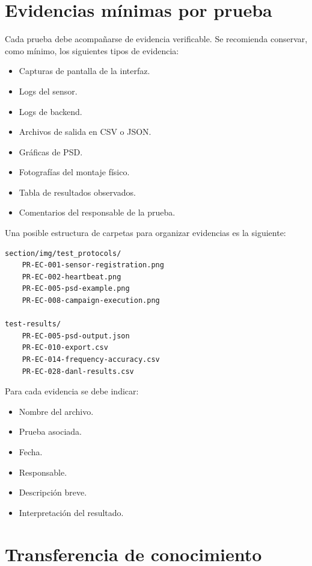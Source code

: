 \section{Evidencias mínimas por prueba}

Cada prueba debe acompañarse de evidencia verificable. Se recomienda conservar, como mínimo, los siguientes tipos de evidencia:

\begin{itemize}
    \item Capturas de pantalla de la interfaz.
    \item Logs del sensor.
    \item Logs de backend.
    \item Archivos de salida en CSV o JSON.
    \item Gráficas de PSD.
    \item Fotografías del montaje físico.
    \item Tabla de resultados observados.
    \item Comentarios del responsable de la prueba.
\end{itemize}

Una posible estructura de carpetas para organizar evidencias es la siguiente:

\begin{verbatim}
section/img/test_protocols/
    PR-EC-001-sensor-registration.png
    PR-EC-002-heartbeat.png
    PR-EC-005-psd-example.png
    PR-EC-008-campaign-execution.png

test-results/
    PR-EC-005-psd-output.json
    PR-EC-010-export.csv
    PR-EC-014-frequency-accuracy.csv
    PR-EC-028-danl-results.csv
\end{verbatim}

Para cada evidencia se debe indicar:

\begin{itemize}
    \item Nombre del archivo.
    \item Prueba asociada.
    \item Fecha.
    \item Responsable.
    \item Descripción breve.
    \item Interpretación del resultado.
\end{itemize}

\section{Transferencia de conocimiento}

